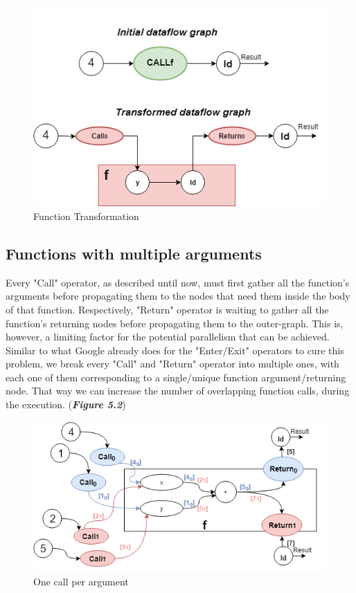 \documentclass[ack,preface]{dithesis}
\begin{document}
\begin{figure}
\centering
\includegraphics[scale=0.65]{figures/transformation}
\caption{Function Transformation}
\end{figure}

    \subsection{Functions with multiple arguments}

Every "Call" operator, as described until now, must first gather all the function's arguments before propagating them to the nodes that need them inside the body of that function. Respectively, "Return" operator is waiting to gather all the function's returning nodes before propagating them to the outer-graph. This is, however, a limiting factor for the potential parallelism that can be achieved. Similar to what Google already does for the "Enter/Exit" operators to cure this problem, we break every "Call" and "Return" operator into multiple ones, with each one of them corresponding to a single/unique function argument/returning node. That way we can increase the number of overlapping function calls, during the execution. (\textit{\textbf{Figure 5.2}})

\begin{figure}[h]
\centering
\includegraphics[scale=0.62]{figures/breakops}
\caption{One call per argument}
\end{figure}
\end{document}
